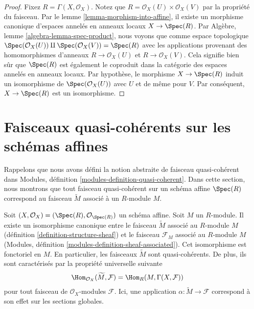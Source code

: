 \begin{proof}
Fixez $R = \Gamma(X, \mathcal{O}_X)$.
Notez que $R = \mathcal{O}_X(U) \times \mathcal{O}_X(V)$ par la
propriété du faisceau. Par le lemme \ref{lemma-morphism-into-affine}, il
existe un morphisme canonique d'espaces annelés en anneaux
locaux $X \to \Spec(R)$. Par Algèbre, lemme \ref{algebra-lemma-spec-product},
nous voyons que comme espace topologique
$\Spec(\mathcal{O}_X(U)) \amalg \Spec(\mathcal{O}_X(V)) =
\Spec(R)$
avec les applications provenant des homomorphismes d'anneaux
$R \to \mathcal{O}_X(U)$ et $R \to \mathcal{O}_X(V)$.
Cela signifie bien sûr que $\Spec(R)$ est également le coproduit
dans la catégorie des espaces annelés en anneaux
locaux. Par hypothèse, le morphisme $X \to \Spec(R)$ induit un isomorphisme
de $\Spec(\mathcal{O}_X(U))$ avec $U$ et de même pour $V$.
Par conséquent, $X \to \Spec(R)$ est un isomorphisme.
\end{proof}















\section{Faisceaux quasi-cohérents sur les schémas affines}
\label{section-quasi-coherent-affine}

\noindent
Rappelons que nous avons défini la notion abstraite de faisceau quasi-cohérent
dans Modules, définition \ref{modules-definition-quasi-coherent}.
Dans cette section, nous montrons que tout faisceau quasi-cohérent sur
un schéma affine $\Spec(R)$ correspond au faisceau $\widetilde M$ associé à
un $R$-module $M$.

\begin{lemma}
\label{lemma-compare-constructions}
Soit $(X, \mathcal{O}_X) = (\Spec(R), \mathcal{O}_{\Spec(R)})$
un schéma affine. Soit $M$ un $R$-module. Il existe un isomorphisme
canonique entre le faisceau $\widetilde M$ associé au $R$-module $M$
(définition \ref{definition-structure-sheaf}) et le faisceau
$\mathcal{F}_M$ associé au $R$-module $M$ (Modules,
définition \ref{modules-definition-sheaf-associated}). Cet isomorphisme
est fonctoriel en $M$. En particulier, les
faisceaux $\widetilde M$ sont quasi-cohérents. De plus, ils sont
caractérisés par la propriété universelle suivante
$$
\Hom_{\mathcal{O}_X}(\widetilde M, \mathcal{F}) =
\Hom_R(M,
\Gamma(X, \mathcal{F}))
$$
pour tout faisceau de $\mathcal{O}_X$-modules $\mathcal{F}$. Ici,
une application $\alpha : \widetilde M \to \mathcal{F}$ correspond à
son effet sur les sections globales.
\end{lemma}

